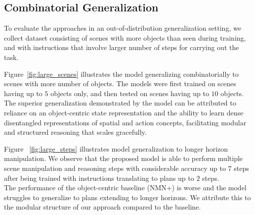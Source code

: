 \subsection{Combinatorial Generalization} 

To evaluate the approaches in an out-of-distribution generalization setting, we collect dataset consisting of scenes with more objects than seen during training, and with instructions that involve larger number of steps for carrying out the task.

Figure~\ref{fig:large_scenes} illustrates the model generalizing combinatorially to scenes with more number of objects. The models were first trained on scenes having up to $5$ objects only, and then tested on scenes having up to $10$ objects.\\ 
%
The superior generalization demonstrated by the model can be attributed to reliance on an object-centric state representation and the ability to learn dense disentangled representations of spatial and action concepts, facilitating modular and structured reasoning that scales gracefully. 

Figure ~\ref{fig:large_steps} illustrates model generalization to longer horizon manipulation. We observe that the proposed model is able to perform multiple scene manipulation and reasoning steps with considerable accuracy up to $7$ steps after being trained with instructions translating to plans up to $2$ steps.\\ 
%
The performance of the object-centric baseline (NMN+) is worse and the model struggles to generalize to plans extending to longer horizons. We attribute this to the modular structure of our approach compared to the baseline.

%
